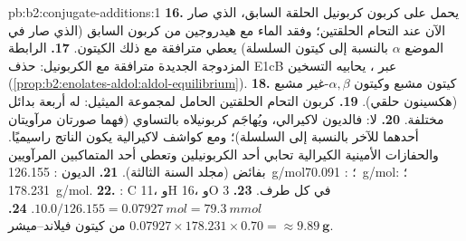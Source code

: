 \begin{solution}{pb:b2:conjugate-additions:1}
\textbf{16.} يحمل   على كربون كربونيل الحلقة السابق، الذي صار الآن عند التحام الحلقتين؛ وفقد
الماء مع هيدروجين من كربون  السابق (الذي صار في الموضع $\alpha$ بالنسبة إلى كيتون السلسلة) يعطي
 مترافقة مع ذلك الكيتون.
\textbf{17.} الرابطة المزدوجة الجديدة مترافقة مع الكربونيل: حذف E1cB عبر
، يحابيه التسخين (\cref{prop:b2:enolates-aldol:aldol-equilibrium}).
\textbf{18.} كيتون مشبع وكيتون $\alpha,\beta$-غير مشبع (هكسينون حلقي).
\textbf{19.} كربون التحام الحلقتين الحامل لمجموعة الميثيل: له أربعة بدائل مختلفة.
\textbf{20.} لا: فالديون لاكيرالي، ويُهاجَم كربونيلاه بالتساوي (فهما صورتان مرآويتان أحدهما للآخر
بالنسبة إلى السلسلة)؛ ومع كواشف لاكيرالية يكون الناتج راسيميًا. والحفازات الأمينية الكيرالية
تحابي أحد الكربونيلين وتعطي أحد المتماكبين المرآويين بفائض (مجلد السنة الثالثة).
\textbf{21.} الديون : \qty{126.155}{g/mol}؛ : \qty{70.091}{g/mol}؛ :
\qty{178.231}{g/mol}.
\textbf{22.} : C 11، وH 16، وO 3 في كل طرف.
\textbf{23.} $10.0/126.155 = \qty{0.07927}{mol} = \qty{79.3}{mmol}$.
\textbf{24.} $0.07927 \times 178.231 \times 0.70 = \boldsymbol{\approx \qty{9.89}{g}}$ من
كيتون فيلاند--ميشر.
\end{solution}
